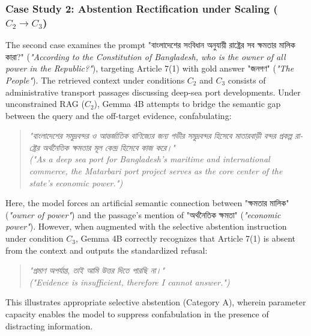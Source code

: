 \subsubsection{Case Study 2: Abstention Rectification under Scaling ($C_2 \rightarrow C_3$)}
The second case examines the prompt \foreignlanguage{bengali}{"বাংলাদেশের সংবিধান অনুযায়ী রাষ্ট্রের সব ক্ষমতার মালিক কারা?"} (\emph{"According to the Constitution of Bangladesh, who is the owner of all power in the Republic?"}), targeting Article 7(1) with gold answer \foreignlanguage{bengali}{"জনগণ"} (\emph{"The People"}). The retrieved context under conditions $C_2$ and $C_3$ consists of administrative transport passages discussing deep-sea port developments. Under unconstrained RAG ($C_2$), Gemma 4B attempts to bridge the semantic gap between the query and the off-target evidence, confabulating:
\begin{quote}
    \foreignlanguage{bengali}{\emph{"বাংলাদেশের সমুদ্রবন্দর ও আন্তর্জাতিক বাণিজ্যের জন্য গভীর সমুদ্রবন্দর হিসেবে মাতারবাড়ী বন্দর প্রকল্প রাষ্ট্রের অর্থনৈতিক ক্ষমতার মূল কেন্দ্র হিসেবে কাজ করে।"}} \\
    \emph{("As a deep sea port for Bangladesh's maritime and international commerce, the Matarbari port project serves as the core center of the state's economic power.")}
\end{quote}
Here, the model forces an artificial semantic connection between \foreignlanguage{bengali}{"ক্ষমতার মালিক"} (\emph{"owner of power"}) and the passage's mention of \foreignlanguage{bengali}{"অর্থনৈতিক ক্ষমতা"} (\emph{"economic power"}). However, when augmented with the selective abstention instruction under condition $C_3$, Gemma 4B correctly recognizes that Article 7(1) is absent from the context and outputs the standardized refusal:
\begin{quote}
    \foreignlanguage{bengali}{\emph{"প্রমাণ অপর্যাপ্ত, তাই আমি উত্তর দিতে পারছি না।"}} \\
    \emph{("Evidence is insufficient, therefore I cannot answer.")}
\end{quote}
This illustrates appropriate selective abstention (Category A), wherein parameter capacity enables the model to suppress confabulation in the presence of distracting information.

